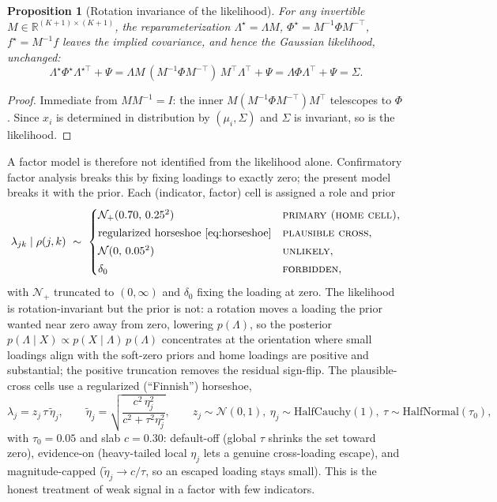 \documentclass[11pt]{article}
\theoremstyle{plain}
\newtheorem{proposition}{Proposition}
\theoremstyle{definition}
\begin{document}
\begin{proposition}[Rotation invariance of the likelihood]\label{prop:rotation}
For any invertible $M\in\mathbb{R}^{(K+1)\times(K+1)}$, the reparameterization
$\Lambda^{\star}=\Lambda M$, $\Phi^{\star}=M^{-1}\Phi M^{-\top}$, $f^{\star}=M^{-1}f$
leaves the implied covariance, and hence the Gaussian likelihood, unchanged:
\begin{equation}
  \Lambda^{\star}\Phi^{\star}\Lambda^{\star\top}+\Psi
  =\Lambda M\,(M^{-1}\Phi M^{-\top})\,M^{\top}\Lambda^{\top}+\Psi
  =\Lambda\Phi\Lambda^{\top}+\Psi=\Sigma .
  \label{eq:rotation}
\end{equation}
\end{proposition}
\begin{proof}
Immediate from $MM^{-1}=I$: the inner $M(M^{-1}\Phi M^{-\top})M^\top$ telescopes to $\Phi$.
Since $x_i$ is determined in distribution by $(\mu_i,\Sigma)$ and $\Sigma$ is invariant, so
is the likelihood.
\end{proof}
\noindent
A factor model is therefore not identified from the likelihood alone. Confirmatory factor
analysis breaks this by fixing loadings to exactly zero; the present model breaks it with
the prior. Each (indicator, factor) cell is assigned a role and prior
\begin{equation}
  \lambda_{jk}\mid\rho(j,k)\ \sim\
  \begin{cases}
    \mathcal{N}_{+}(0.70,\,0.25^2) & \textsc{primary (home cell)},\\[2pt]
    \text{regularized horseshoe } \eqref{eq:horseshoe} & \textsc{plausible cross},\\[2pt]
    \mathcal{N}(0,\,0.05^2) & \textsc{unlikely},\\[2pt]
    \delta_{0} & \textsc{forbidden},
  \end{cases}
  \label{eq:softprior}
\end{equation}
with $\mathcal{N}_{+}$ truncated to $(0,\infty)$ and $\delta_0$ fixing the loading at zero.
The likelihood is rotation-invariant but the prior is not: a rotation moves a loading the
prior wanted near zero away from zero, lowering $p(\Lambda)$, so the posterior
$p(\Lambda\mid X)\propto p(X\mid\Lambda)\,p(\Lambda)$ concentrates at the orientation where
small loadings align with the soft-zero priors and home loadings are positive and
substantial; the positive truncation removes the residual sign-flip. The plausible-cross
cells use a regularized (``Finnish'') horseshoe,
\begin{equation}
  \lambda_j=z_j\,\tau\,\tilde\eta_j,\qquad
  \tilde\eta_j=\sqrt{\dfrac{c^2\,\eta_j^2}{c^2+\tau^2\eta_j^2}},\qquad
  z_j\sim\mathcal N(0,1),\ \eta_j\sim\mathrm{HalfCauchy}(1),\ \tau\sim\mathrm{HalfNormal}(\tau_0),
  \label{eq:horseshoe}
\end{equation}
with $\tau_0=0.05$ and slab $c=0.30$: default-off (global $\tau$ shrinks the set toward
zero), evidence-on (heavy-tailed local $\eta_j$ lets a genuine cross-loading escape), and
magnitude-capped ($\tilde\eta_j\to c/\tau$, so an escaped loading stays small). This is the
honest treatment of weak signal in a factor with few indicators.
\end{document}
